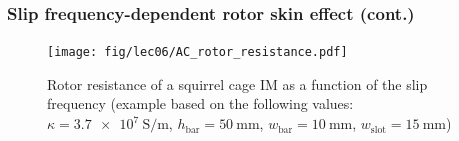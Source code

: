 \begin{frame}
	\frametitle{Slip frequency-dependent rotor skin effect (cont.)}
    \begin{figure}
        \centering
        \texttt{[image: fig/lec06/AC\_rotor\_resistance.pdf]}
        \caption{Rotor resistance of a squirrel cage IM as a function of the slip frequency (example based on the following values: $\kappa = \SI{3.7e7}{\siemens\per\metre}$, $h_\mathrm{bar} = \SI{50}{\milli\metre}$, $w_\mathrm{bar} = \SI{10}{\milli\metre}$, $w_\mathrm{slot} = \SI{15}{\milli\metre}$)}
        \label{fig:AC_rotor_resistance}
    \end{figure}
\end{frame}

